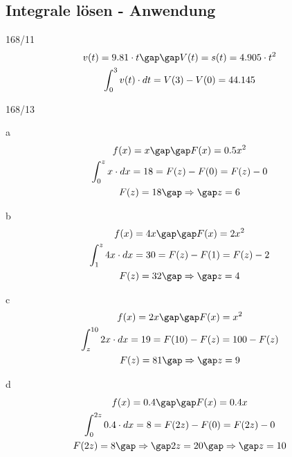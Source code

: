 \subsection{Integrale lösen - Anwendung}
\begin{exercise}{168/11}
  \begin{gather*}
    v(t) = 9.81 \cdot t \gap\gap V(t) = s(t) = 4.905 \cdot t^2 \\
    \int_0^3 v(t) \cdot dt = V(3) - V(0) = 44.145
  \end{gather*}
\end{exercise}
\begin{exercise}{168/13}
  \item [a]
  \begin{gather*}
    f(x) = x \gap\gap F(x) = 0.5x^2 \\
    \int_0^z x \cdot dx = 18 = F(z) - F(0) = F(z) - 0 \\
    F(z) = 18 \gap\Rightarrow\gap z = 6
  \end{gather*}
  \item [b]
  \begin{gather*}
    f(x) = 4x \gap\gap F(x) = 2x^2 \\
    \int_1^z 4x \cdot dx = 30 = F(z) - F(1) = F(z) - 2 \\
    F(z) = 32 \gap\Rightarrow\gap z = 4
  \end{gather*}
  \item [c]
  \begin{gather*}
    f(x) = 2x \gap\gap F(x) = x^2 \\
    \int_z^{10} 2x \cdot dx = 19 = F(10) - F(z) = 100 - F(z) \\
    F(z) = 81 \gap\Rightarrow\gap z = 9
  \end{gather*}
  \item [d]
  \begin{gather*}
    f(x) = 0.4 \gap\gap F(x) = 0.4x \\
    \int_0^{2z} 0.4 \cdot dx = 8 = F(2z) - F(0) = F(2z) - 0 \\
    F(2z) = 8 \gap\Rightarrow\gap 2z = 20 \gap\Rightarrow\gap z = 10
  \end{gather*}
\end{exercise}
